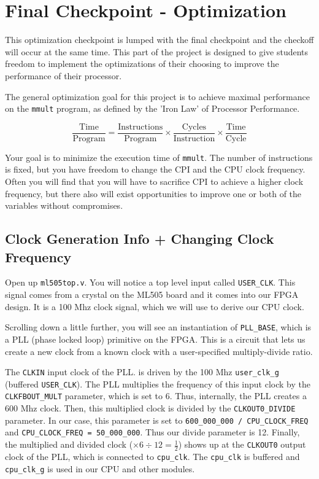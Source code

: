 \documentclass[11pt]{article}
\begin{document}
\pagebreak

\section{Final Checkpoint - Optimization}
This optimization checkpoint is lumped with the final checkpoint and the checkoff will occur at the same time. This part of the project is designed to give students freedom to implement the optimizations of their choosing to improve the performance of their processor.

The general optimization goal for this project is to achieve maximal performance on the \verb|mmult| program, as defined by the 'Iron Law' of Processor Performance.

\begin{equation*}
\frac{\text{Time}}{\text{Program}} = \frac{\text{Instructions}}{\text{Program}} \times \frac{\text{Cycles}}{\text{Instruction}} \times \frac{\text{Time}}{\text{Cycle}}
\end{equation*}

Your goal is to minimize the execution time of \verb|mmult|. The number of instructions is fixed, but you have freedom to change the CPI and the CPU clock frequency. Often you will find that you will have to sacrifice CPI to achieve a higher clock frequency, but there also will exist opportunities to improve one or both of the variables without compromises.

\subsection{Clock Generation Info + Changing Clock Frequency}
Open up \verb|ml505top.v|. You will notice a top level input called \verb|USER_CLK|. This signal comes from a crystal on the ML505 board and it comes into our FPGA design. It is a 100 Mhz clock signal, which we will use to derive our CPU clock.

Scrolling down a little further, you will see an instantiation of \verb|PLL_BASE|, which is a PLL (phase locked loop) primitive on the FPGA. This is a circuit that lets us create a new clock from a known clock with a user-specified multiply-divide ratio. 

The \verb|CLKIN| input clock of the PLL. is driven by the 100 Mhz \verb|user_clk_g| (buffered \verb|USER_CLK|). The PLL multiplies the frequency of this input clock by the \verb|CLKFBOUT_MULT| parameter, which is set to 6. Thus, internally, the PLL creates a 600 Mhz clock. Then, this multiplied clock is divided by the \verb|CLKOUT0_DIVIDE| parameter. In our case, this parameter is set to \verb|600_000_000 / CPU_CLOCK_FREQ| and \verb|CPU_CLOCK_FREQ = 50_000_000|. Thus our divide parameter is 12. Finally, the multiplied and divided clock ($\times 6 \div 12 = \frac{1}{2}$) shows up at the \verb|CLKOUT0| output clock of the PLL, which is connected to \verb|cpu_clk|. The \verb|cpu_clk| is buffered and \verb|cpu_clk_g| is used in our CPU and other modules.
\end{document}

